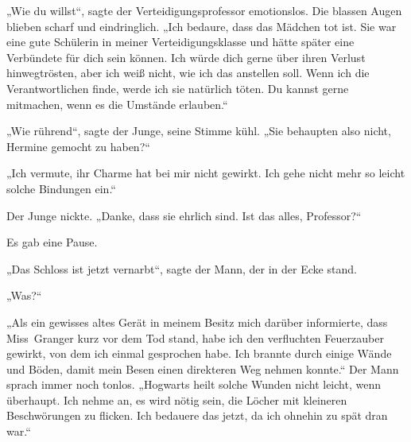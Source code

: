 „Wie du willst“, sagte der Verteidigungsprofessor emotionslos. Die blassen Augen blieben scharf und eindringlich.
„Ich bedaure, dass das Mädchen tot ist. Sie war eine gute Schülerin in meiner Verteidigungsklasse und hätte später eine Verbündete für dich sein können. Ich würde dich gerne über ihren Verlust hinwegtrösten, aber ich weiß nicht, wie ich das anstellen soll. Wenn ich die Verantwortlichen finde, werde ich sie natürlich töten. Du kannst gerne mitmachen, wenn es die Umstände erlauben.“

„Wie rührend“, sagte der Junge, seine Stimme kühl.
„Sie behaupten also nicht, Hermine gemocht zu haben?“

„Ich vermute, ihr Charme hat bei mir nicht gewirkt. Ich gehe nicht mehr so leicht solche Bindungen ein.“

Der Junge nickte.
„Danke, dass sie ehrlich sind. Ist das alles, Professor?“

Es gab eine Pause.

„Das Schloss ist jetzt vernarbt“, sagte der Mann, der in der Ecke stand.

„Was?“

„Als ein gewisses altes Gerät in meinem Besitz mich darüber informierte, dass Miss~Granger kurz vor dem Tod stand, habe ich den verfluchten Feuerzauber gewirkt, von dem ich einmal gesprochen habe. Ich brannte durch einige Wände und Böden, damit mein Besen einen direkteren Weg nehmen konnte.“
Der Mann sprach immer noch tonlos.
„Hogwarts heilt solche Wunden nicht leicht, wenn überhaupt. Ich nehme an, es wird nötig sein, die Löcher mit kleineren Beschwörungen zu flicken. Ich bedauere das jetzt, da ich ohnehin zu spät dran war.“

